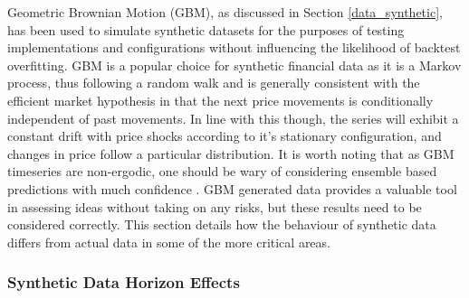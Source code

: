 \documentclass[a4paper,11pt,oneside]{article}
\theoremstyle{plain}
\theoremstyle{definition}
\begin{document}
	Geometric Brownian Motion (GBM), as discussed in Section \ref{data_synthetic}, has been used to simulate synthetic datasets for the purposes of testing implementations and configurations without influencing the likelihood of backtest overfitting. GBM is a popular choice for synthetic financial data as it is a Markov process, thus following a random walk and is generally consistent with the efficient market hypothesis in that the next price movements is conditionally independent of past movements. In line with this though, the series will exhibit a constant drift with price shocks according to it's stationary configuration, and changes in price follow a particular distribution. It is worth noting that as GBM timeseries are non-ergodic, one should be wary of considering ensemble based predictions with much confidence \citep{Peters}. GBM generated data provides a valuable tool in assessing ideas without taking on any risks, but these results need to be considered correctly. This section details how the behaviour of synthetic data differs from actual data in some of the more critical areas.
	
	\subsubsection{Synthetic Data Horizon Effects}\label{results_synthdata_mse}
	
\end{document}
